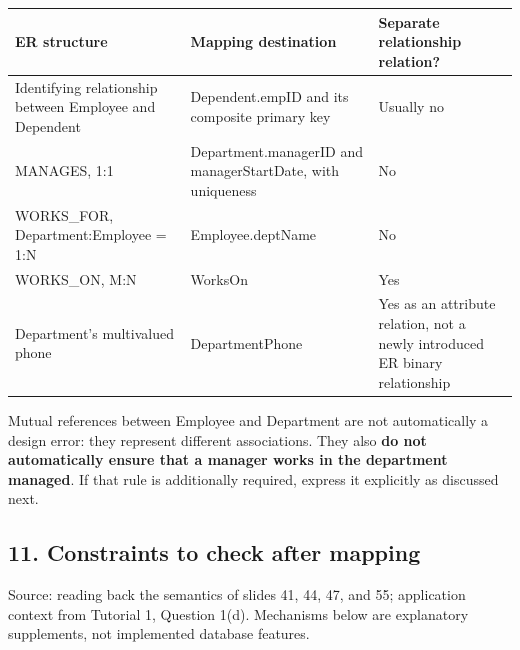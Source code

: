 \begin{longtable}[]{@{}
  >{\raggedright\arraybackslash}p{}
  >{\raggedright\arraybackslash}p{}
  >{\raggedright\arraybackslash}p{}@{}}
\toprule\noalign{}
\begin{minipage}[b]{\linewidth}\raggedright
ER structure
\end{minipage} & \begin{minipage}[b]{\linewidth}\raggedright
Mapping destination
\end{minipage} & \begin{minipage}[b]{\linewidth}\raggedright
Separate relationship relation?
\end{minipage} \\
\midrule\noalign{}
\endhead
\bottomrule\noalign{}
\endlastfoot
Identifying relationship between Employee and Dependent & Dependent.empID and its composite primary key & Usually no \\
MANAGES, 1:1 & Department.managerID and managerStartDate, with uniqueness & No \\
WORKS\_FOR, Department:Employee = 1:N & Employee.deptName & No \\
WORKS\_ON, M:N & WorksOn & Yes \\
Department's multivalued phone & DepartmentPhone & Yes as an attribute relation, not a newly introduced ER binary relationship \\
\end{longtable}

Mutual references between Employee and Department are not automatically a design error: they represent different associations. They also \textbf{do not automatically ensure that a manager works in the department managed}. If that rule is additionally required, express it explicitly as discussed next.

\subsection{11. Constraints to check after mapping}\label{04_er_to_relational_mapping_en-constraints-to-check-after-mapping}

Source: reading back the semantics of slides 41, 44, 47, and 55; application context from Tutorial 1, Question 1(d). Mechanisms below are explanatory supplements, not implemented database features.

